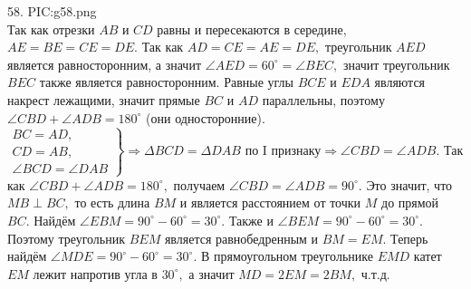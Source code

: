 58. {{PIC:g58.png}}\\
Так как отрезки $AB$ и $CD$ равны и пересекаются в середине, $AE=BE=CE=DE.$ Так как $AD=CE=AE=DE,$ треугольник $AED$ является равносторонним, а значит $\angle AED=60^\circ=\angle BEC,$ значит треугольник $BEC$ также является равносторонним. Равные углы $BCE$ и $EDA$ являются накрест лежащими, значит прямые $BC$ и $AD$ параллельны, поэтому $\angle CBD+\angle ADB=180^\circ$ (они односторонние). $\left.\begin{array}{l}BC=AD,\\
CD=AB,\\
\angle BCD=\angle DAB  \end{array}\right\}\Rightarrow \Delta BCD=\Delta DAB\text{ по I признаку}\Rightarrow \angle CBD=\angle ADB.$ Так как $\angle CBD+\angle ADB=180^\circ,$ получаем $\angle CBD=\angle ADB=90^\circ.$ Это значит, что $MB\perp BC,$ то есть длина $BM$ и является расстоянием от точки $M$ до прямой $BC.$ Найдём $\angle EBM=90^\circ-60^\circ=30^\circ.$ Также и $\angle BEM=90^\circ-60^\circ=30^\circ.$ Поэтому треугольник $BEM$ является равнобедренным и $BM=EM.$ Теперь найдём $\angle MDE=90^\circ-60^\circ=30^\circ.$ В прямоугольном треугольнике $EMD$ катет $EM$ лежит напротив угла в $30^\circ,$ а значит $MD=2EM=2BM,$ ч.т.д.\\
